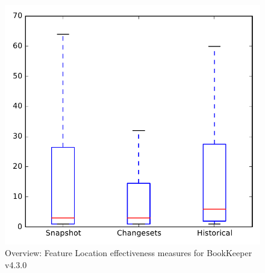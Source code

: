 
\begin{figure}
\centering
\includegraphics[height=0.4\textheight]{figures/flt/all_bookkeeper_no_outlier}
\caption{Overview: Feature Location effectiveness measures for BookKeeper v4.3.0}
\label{fig:flt:all:bookkeeper}
\end{figure}
